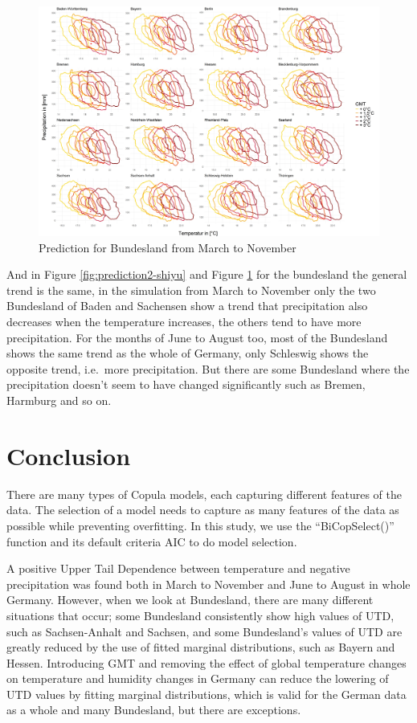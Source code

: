 \documentclass[
]{krantz}
\begin{document}
\begin{figure}

{\centering \includegraphics[width=0.8\linewidth]{work/03-compounds/figures/GMT/predictbundeslandJJA} 

}

\caption{Prediction for Bundesland from March to November}\label{fig:prediction3-shiyu}
\end{figure}

And in Figure \ref{fig:prediction2-shiyu} and Figure \ref{fig:prediction3-shiyu} for the bundesland the general trend is the same, in the simulation from March to November only the two Bundesland of Baden and Sachensen show a trend that precipitation also decreases when the temperature increases, the others tend to have more precipitation. For the months of June to August too, most of the Bundesland shows the same trend as the whole of Germany, only Schleswig shows the opposite trend, i.e.~more precipitation. But there are some Bundesland where the precipitation doesn't seem to have changed significantly such as Bremen, Harmburg and so on.

\section{Conclusion}\label{conclusion-shiyu}

There are many types of Copula models, each capturing different features of the data. The selection of a model needs to capture as many features of the data as possible while preventing overfitting. In this study, we use the ``BiCopSelect()'' function and its default criteria AIC to do model selection.

A positive Upper Tail Dependence between temperature and negative precipitation was found both in March to November and June to August in whole Germany. However, when we look at Bundesland, there are many different situations that occur; some Bundesland consistently show high values of UTD, such as Sachsen-Anhalt and Sachsen, and some Bundesland's values of UTD are greatly reduced by the use of fitted marginal distributions, such as Bayern and Hessen. Introducing GMT and removing the effect of global temperature changes on temperature and humidity changes in Germany can reduce the lowering of UTD values by fitting marginal distributions, which is valid for the German data as a whole and many Bundesland, but there are exceptions.
\end{document}
